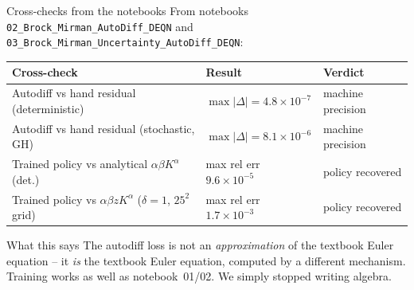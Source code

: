 \documentclass[aspectratio=169,11pt]{beamer}
\begin{document}
\begin{frame}[fragile]{Cross-checks from the notebooks}
\footnotesize From notebooks \texttt{02\_Brock\_Mirman\_AutoDiff\_DEQN} and \texttt{03\_Brock\_Mirman\_Uncertainty\_AutoDiff\_DEQN}:
\vspace{2pt}
\begin{center}
\renewcommand{\arraystretch}{1.15}
\begin{tabular}{p{6.4cm} p{3.5cm} p{2.8cm}}
\toprule
\textbf{Cross-check} & \textbf{Result} & \textbf{Verdict} \\
\midrule
Autodiff vs hand residual (deterministic) & $\max|\Delta| = 4.8\!\times\!10^{-7}$ & machine precision \\
Autodiff vs hand residual (stochastic, GH) & $\max|\Delta| = 8.1\!\times\!10^{-6}$ & machine precision \\
Trained policy vs analytical $\alpha\beta K^\alpha$ (det.) & max rel err $9.6\!\times\!10^{-5}$ & policy recovered \\
Trained policy vs $\alpha\beta z K^\alpha$ ($\delta\!=\!1$, $25^2$ grid) & max rel err $1.7\!\times\!10^{-3}$ & policy recovered \\
\bottomrule
\end{tabular}
\end{center}
\vspace{4pt}
\begin{block}{What this says}
\footnotesize The autodiff loss is not an \emph{approximation} of the textbook Euler equation -- it \emph{is} the textbook Euler equation, computed by a different mechanism. Training works as well as notebook~01/02. We simply stopped writing algebra.
\end{block}
\end{frame}
\end{document}
